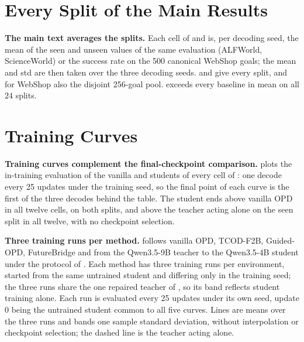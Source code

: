 \section{Every Split of the Main Results}
\label{app:results}
\label{app:splits}

\textbf{The main text averages the splits.} Each cell of  and  is, per decoding seed, the mean of the seen and unseen values of the same evaluation (ALFWorld, ScienceWorld) or the success rate on the 500 canonical WebShop goals; the mean and std are then taken over the three decoding seeds.  and  give every split, and for WebShop also the disjoint 256-goal pool. \method{} exceeds every baseline in mean on all $24$ splits.




\section{Training Curves}
\label{app:curves}
\label{app:curves-all}



\textbf{Training curves complement the final-checkpoint comparison.}  plots the in-training evaluation of the vanilla and \method{} students of every cell of : one decode every 25 updates under the training seed, so the final point of each curve is the first of the three decodes behind the table. The \method{} student ends above vanilla OPD in all twelve cells, on both splits, and above the teacher acting alone on the seen split in all twelve, with no checkpoint selection.

\textbf{Three training runs per method.}  follows vanilla OPD, TCOD-F2B, Guided-OPD, FutureBridge and \method{} from the Qwen3.5-9B teacher to the Qwen3.5-4B student under the protocol of . Each method has three training runs per environment, started from the same untrained student and differing only in the training seed; the three \method{} runs share the one repaired teacher of , so its band reflects student training alone. Each run is evaluated every 25 updates under its own seed, update 0 being the untrained student common to all five curves. Lines are means over the three runs and bands one sample standard deviation, without interpolation or checkpoint selection; the dashed line is the teacher acting alone.
